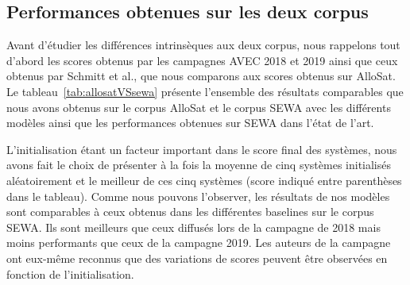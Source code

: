 \subsection{Performances obtenues sur les deux corpus}
Avant d'étudier les différences intrinsèques aux deux corpus, nous rappelons tout d'abord les scores obtenus par les campagnes AVEC 2018 et 2019 ainsi que ceux obtenus par Schmitt et al., que nous comparons aux scores obtenus sur AlloSat. Le tableau~\ref{tab:allosatVSsewa} présente l'ensemble des résultats comparables que nous avons obtenus sur le corpus AlloSat et le corpus SEWA avec les différents modèles ainsi que les performances obtenues sur SEWA dans l'état de l'art.
%
%



 L'initialisation étant un facteur important dans le score final des systèmes, nous avons fait le choix de présenter à la fois la moyenne de cinq systèmes initialisés aléatoirement et le meilleur de ces cinq systèmes (score indiqué entre parenthèses dans le tableau). Comme nous pouvons l'observer, les résultats de nos modèles sont comparables à ceux obtenus dans les différentes baselines sur le corpus SEWA. Ils sont meilleurs que ceux diffusés lors de la campagne de 2018 mais moins performants que ceux de la campagne 2019. Les auteurs de la campagne ont eux-même reconnus que des variations de scores peuvent être observées en fonction de l'initialisation.

